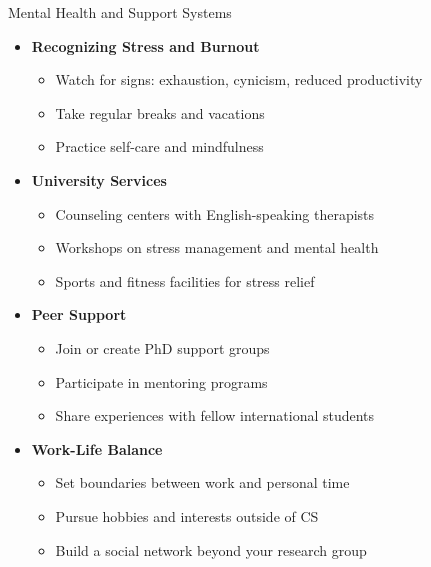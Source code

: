 \documentclass[aspectratio=169,10pt]{beamer}
\begin{document}
\begin{frame}{Mental Health and Support Systems}
\begin{itemize}
    \item \textbf{Recognizing Stress and Burnout}
    \begin{itemize}
        \item Watch for signs: exhaustion, cynicism, reduced productivity
        \item Take regular breaks and vacations
        \item Practice self-care and mindfulness
    \end{itemize}
    \item \textbf{University Services}
    \begin{itemize}
        \item Counseling centers with English-speaking therapists
        \item Workshops on stress management and mental health
        \item Sports and fitness facilities for stress relief
    \end{itemize}
    \item \textbf{Peer Support}
    \begin{itemize}
        \item Join or create PhD support groups
        \item Participate in mentoring programs
        \item Share experiences with fellow international students
    \end{itemize}
    \item \textbf{Work-Life Balance}
    \begin{itemize}
        \item Set boundaries between work and personal time
        \item Pursue hobbies and interests outside of CS
        \item Build a social network beyond your research group
    \end{itemize}
\end{itemize}
\end{frame}
\end{document}
